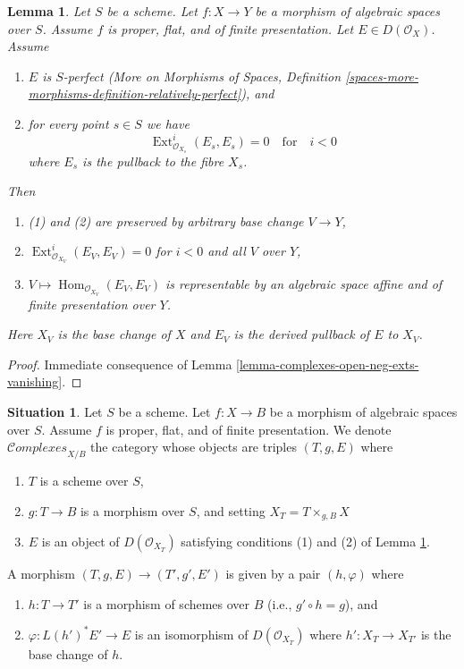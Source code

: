 \documentclass[10pt,a4paper]{amsart}
\theoremstyle{plain}
\newtheorem{lemma}[subsection]{Lemma}
\theoremstyle{definition}
\newtheorem{situation}[subsection]{Situation}
\theoremstyle{remark}
\numberwithin{equation}{subsection}
\def\Hom{\mathop{\mathrm{Hom}}\nolimits}
\def\Ext{\mathop{\mathrm{Ext}}\nolimits}
\def\Complexesstack{\mathcal{C}\!\mathit{omplexes}}
\begin{document}
\begin{lemma}
\label{lemma-complexes}
Let $S$ be a scheme. Let $f : X \to Y$ be a morphism of algebraic
spaces over $S$. Assume $f$ is proper, flat, and of finite presentation.
Let $E \in D(\mathcal{O}_X)$.
Assume
\begin{enumerate}
\item $E$ is $S$-perfect (More on Morphisms of Spaces, Definition
\ref{spaces-more-morphisms-definition-relatively-perfect}), and
\item for every point $s \in S$ we have
$$
\Ext^i_{\mathcal{O}_{X_s}}(E_s, E_s) = 0
\quad\text{for}\quad i < 0
$$
where $E_s$ is the pullback to the fibre $X_s$.
\end{enumerate}
Then
\begin{enumerate}
\item[(a)] (1) and (2) are preserved by arbitrary base change $V \to Y$,
\item[(b)] $\Ext^i_{\mathcal{O}_{X_V}}(E_V, E_V) = 0$ for $i < 0$
and all $V$ over $Y$,
\item[(c)] $V \mapsto \Hom_{\mathcal{O}_{X_V}}(E_V, E_V)$ is representable
by an algebraic space affine and of finite presentation over $Y$.
\end{enumerate}
Here $X_V$ is the base change of $X$ and $E_V$ is the derived pullback
of $E$ to $X_V$.
\end{lemma}

\begin{proof}
Immediate consequence of Lemma \ref{lemma-complexes-open-neg-exts-vanishing}.
\end{proof}

\begin{situation}
\label{situation-complexes}
Let $S$ be a scheme. Let $f : X \to B$ be a morphism of algebraic spaces
over $S$. Assume $f$ is proper, flat, and of finite presentation.
We denote $\Complexesstack_{X/B}$ the category whose objects are
triples $(T, g, E)$ where
\begin{enumerate}
\item $T$ is a scheme over $S$,
\item $g : T \to B$ is a morphism over $S$, and setting
$X_T = T \times_{g, B} X$
\item $E$ is an object of $D(\mathcal{O}_{X_T})$ satisfying
conditions (1) and (2) of Lemma \ref{lemma-complexes}.
\end{enumerate}
A morphism $(T, g, E) \to (T', g', E')$
is given by a pair $(h, \varphi)$ where
\begin{enumerate}
\item $h : T \to T'$ is a morphism of schemes over $B$
(i.e., $g' \circ h = g$), and
\item $\varphi : L(h')^*E' \to E$ is an
isomorphism of $D(\mathcal{O}_{X_T})$ where $h' : X_T \to X_{T'}$
is the base change of $h$.
\end{enumerate}
\end{situation}
\end{document}

